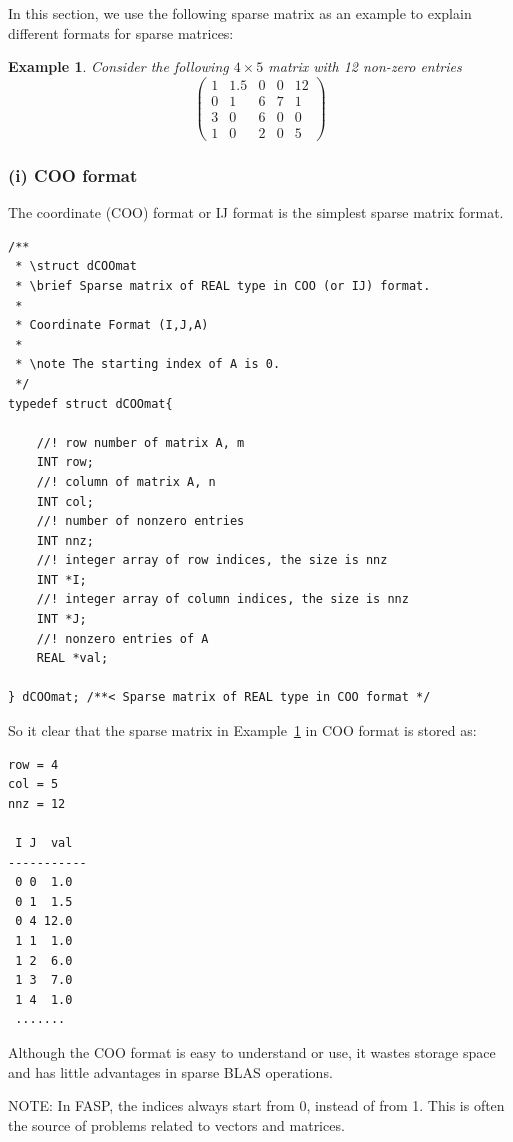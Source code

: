 \documentclass[11pt]{memoir}
\newtheorem{example}[theorem]{Example}
\begin{document}
In this section, we use the following sparse matrix as an example to explain different formats for sparse matrices:
%
\begin{example}\label{ex:sparse}
Consider the following $4\times 5$ matrix with 12 non-zero entries
$$
\left(\begin{array}{ccccc}
1 & 1.5 & 0 & 0 & 12\\
0 & 1    & 6 & 7 & 1\\
3 & 0    & 6 & 0 & 0\\
1 & 0    & 2 & 0 & 5
\end{array}
\right)
$$
\end{example}

\subsubsection*{(i) COO format}

The coordinate (COO) format or IJ format is the simplest sparse matrix format.
\begin{lstlisting}
/**
 * \struct dCOOmat
 * \brief Sparse matrix of REAL type in COO (or IJ) format.
 *
 * Coordinate Format (I,J,A)
 *
 * \note The starting index of A is 0.
 */
typedef struct dCOOmat{
	
	//! row number of matrix A, m
	INT row;
	//! column of matrix A, n
	INT col;
	//! number of nonzero entries
	INT nnz;
	//! integer array of row indices, the size is nnz
	INT *I;
	//! integer array of column indices, the size is nnz
	INT *J;
	//! nonzero entries of A
	REAL *val;
	
} dCOOmat; /**< Sparse matrix of REAL type in COO format */
\end{lstlisting}
%
So it clear that the sparse matrix in Example~\ref{ex:sparse} in COO format is stored as:
%
\begin{lstlisting}[numbers=none]
row = 4
col = 5
nnz = 12

 I J  val
-----------
 0 0  1.0
 0 1  1.5
 0 4 12.0
 1 1  1.0
 1 2  6.0
 1 3  7.0
 1 4  1.0
 .......
\end{lstlisting}
%
Although the COO format is easy to understand or use, it wastes storage space and has little advantages in sparse BLAS operations.

\begin{snugshade}\noindent
NOTE: In FASP, the indices always start from 0, instead of from 1. This is often the source of problems related to vectors and matrices.
\end{snugshade}
\end{document}
